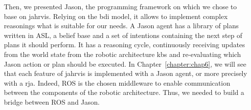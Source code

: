 \documentclass[a4paper,11pt,twoside]{StyleThese}
\begin{document}
Then, we presented Jason, the programming framework on which we chose to base on \acrshort{jahrvis}. Relying on the \acrshort{bdi} model, it allows to implement complex reasonings what is suitable for our needs. A Jason agent has a library of plans written in ASL, a belief base and a set of intentions containing the next step of plans it should perform. It has a reasoning cycle, continuously receiving updates from the world state from the robotic architecture \acrshort{kb}s and re-evaluating which Jason action or plan should be executed. In Chapter~\ref{chapter:chap6}, we will see that each feature of \acrshort{jahrvis} is implemented with a Jason agent, or more precisely with a \acrfull{rja}. Indeed, ROS is the chosen middleware to enable communication between the components of the robotic architecture. Thus, we needed to build a bridge between ROS and Jason. 


\ifdefined{}
\else


\end{document}
